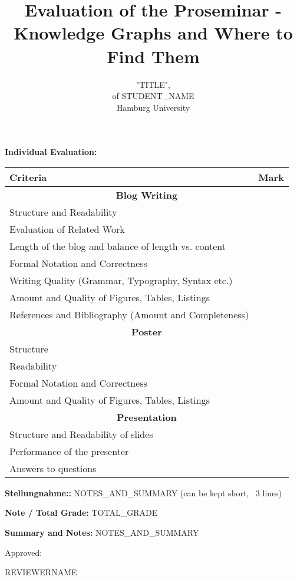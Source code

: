 \documentclass{scrartcl}
\title{Evaluation of the Proseminar -\\Knowledge Graphs and Where to Find Them}
\author{}
\subtitle{"TITLE", \\ of STUDENT\_NAME \\ Hamburg University}
\date{\vspace{-2cm}}
\begin{document}
\maketitle

\textbf{Individual Evaluation:}
\begin{table}[htb!]
\centering
\begin{tabular}{@{}ll@{}}
\toprule
\textbf{Criteria}                                      & \textbf{Mark} \\ \midrule
\multicolumn{2}{c}{\textbf{Blog Writing}}                             \\
Structure and Readability                              &               \\
Evaluation of Related Work                             &               \\
Length of the blog and balance of length vs. content &               \\
Formal Notation and Correctness                        &               \\
Writing Quality (Grammar, Typography, Syntax etc.)     &               \\
Amount and Quality of Figures, Tables, Listings        &               \\
References and Bibliography (Amount and Completeness)  &               \\
\multicolumn{2}{c}{\textbf{Poster}}                             \\
Structure                                              &               \\
Readability                                            &               \\
Formal Notation and Correctness                        &               \\
Amount and Quality of Figures, Tables, Listings        &               \\
\multicolumn{2}{c}{\textbf{Presentation}}                             \\
Structure and Readability of slides                    &               \\
Performance of the presenter                           &               \\
Answers to questions                                   &               \\ \bottomrule
\end{tabular}
\end{table}

\textbf{Stellungnahme::} NOTES\_AND\_SUMMARY (can be kept short, ~3 lines)

\vspace{0.5cm}
\textbf{Note / Total Grade:} TOTAL\_GRADE


\vspace{0.5cm}
\textbf{Summary and Notes:} NOTES\_AND\_SUMMARY

\vspace{0.5cm}
Approved: \hrulefill

\hspace*{0mm}\phantom{Approved: } REVIEWERNAME
\end{document}
